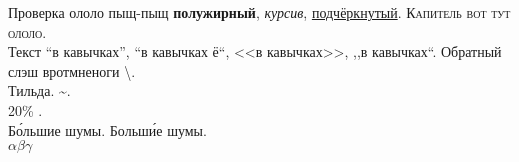 \documentclass[a4paper,12pt]{report} %
\begin{document}
    \begin{center}
        \begin{minipage}{1\textwidth}
            Проверка ололо пыщ-пыщ \textbf{полужирный}, \textit{курсив}, \underline{подчёркнутый}. \textsc{Капитель вот тут ололо}. \\
            Текст ``в кавычках'', ``в кавычках ё``, <<в кавычках>>, ,,в кавычках``.
            Обратный слэш вротмненоги \textbackslash. \\
            Тильда. \textasciitilde. \\
            20\% .\\
            Б\'{о}льшие шумы. Больш\'{и}е шумы.\\
            $ \alpha \beta \gamma $
        \end{minipage}
    \end{center}
\end{document}
